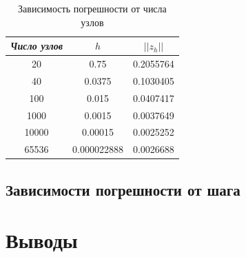\documentclass[12pt]{article}
\begin{document}
\newpage
\begin{table}[H]
\caption{Зависимость погрешности от числа узлов}
\begin{center}
\begin{tabular}{|c|c|c|}
\hline
\textit{Число узлов} &$ h$ & $||z_h||$  \\
\hline
20 & 0.75 & 0.2055764 \\
\hline
40 & 0.0375 & 0.1030405 \\
\hline
100 & 0.015 & 0.0407417 \\
\hline
1000 & 0.0015 & 0.0037649\\
\hline
10000 & 0.00015 & 0.0025252 \\
\hline
65536 & 0.000022888 & 0.0026688 \\
\hline
\end{tabular}
\end{center}
\end{table}

\subsection{Зависимости погрешности от шага}


\section{Выводы}
\end{document}
